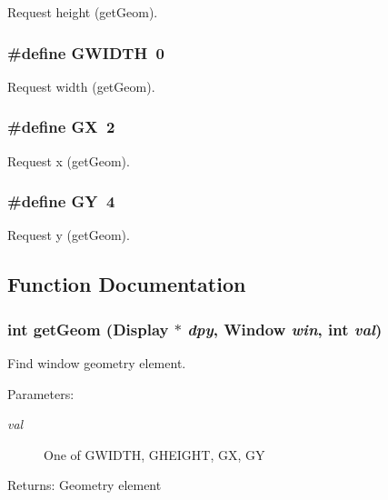 Request height (get\-Geom). 

\subsubsection{\setlength{\rightskip}{0pt plus 5cm}\#define GWIDTH~0}\label{x11_8h_a0}


Request width (get\-Geom). 

\subsubsection{\setlength{\rightskip}{0pt plus 5cm}\#define GX~2}\label{x11_8h_a2}


Request x (get\-Geom). 

\subsubsection{\setlength{\rightskip}{0pt plus 5cm}\#define GY~4}\label{x11_8h_a3}


Request y (get\-Geom). 



\subsection{Function Documentation}
\subsubsection{\setlength{\rightskip}{0pt plus 5cm}int get\-Geom (Display $\ast$ {\em dpy}, Window {\em win}, int {\em val})}\label{x11_8h_a5}


Find window geometry element. 

\begin{Desc}
\item[Parameters:]
\begin{description}
\item[{\em val}]One of GWIDTH, GHEIGHT, GX, GY \end{description}
\end{Desc}
\begin{Desc}
\item[Returns:]Geometry element \end{Desc}
